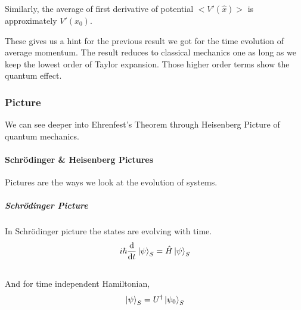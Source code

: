 \documentclass[letterpaper,10pt,english]{sphinxmanual}
\begin{document}
Similarly, the average of first derivative of potential $<V'(\hat x)>$ is approximately $V'(x_0)$.

These gives us a hint for the previous result we got for the time evolution of average momentum. The result reduces to classical mechanics one as long as we keep the lowest order of Taylor expansion. Those higher order terms show the quantum effect.


\subsubsection{Picture}
\label{QuantumMechanics:picture}
We can see deeper into Ehrenfest's Theorem through Heisenberg Picture of quantum mechanics.


\paragraph{Schrödinger \& Heisenberg Pictures}
\label{QuantumMechanics:schrodinger-heisenberg-pictures}
Pictures are the ways we look at the evolution of systems.


\subparagraph{Schrödinger Picture}
\label{QuantumMechanics:schrodinger-picture}
In Schrödinger picture the states are evolving with time.
\begin{gather}
\begin{split}i\hbar \frac{\mathrm{d}}{\mathrm{d} t} \left| \psi\right\rangle _ S = \hat H \left| \psi\right\rangle _ S\end{split}\notag\\\begin{split}\end{split}\notag
\end{gather}
And for time independent Hamiltonian,
\begin{gather}
\begin{split}\left| \psi\right\rangle_S = U^\dagger \left| \psi _ 0\right\rangle _ S\end{split}\notag\\\begin{split}\end{split}\notag
\end{gather}
\end{document}
